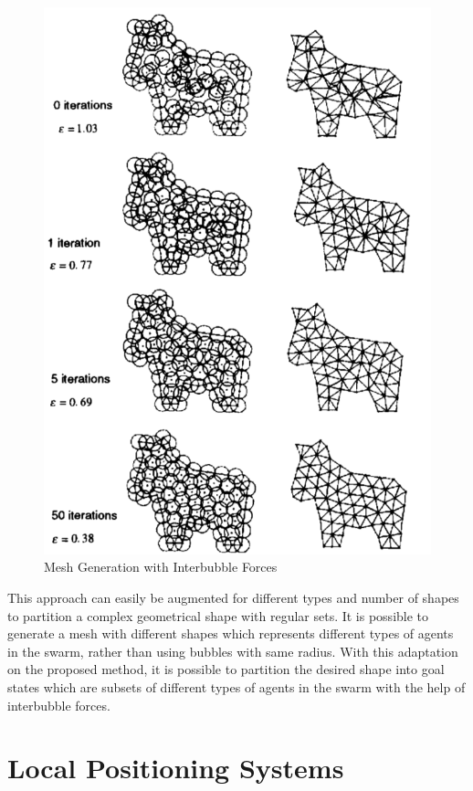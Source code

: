 \begin{figure}[H]
	\caption{Mesh Generation with Interbubble Forces \cite{27}} \label{mesh_genearation_ref}
	\centering
	\includegraphics[scale = 0.4]{interbubble2}
\end{figure}

This approach can easily be augmented for different types and number of shapes to partition a complex geometrical shape with regular sets. It is possible to generate a mesh with different shapes which represents different types of agents in the swarm, rather than using bubbles with same radius. With this adaptation on the proposed method, it is possible to partition the desired shape into goal states which are subsets of different types of agents in the swarm with the help of interbubble forces. 

\section{Local Positioning Systems} \label{LPS_systems_ref}

